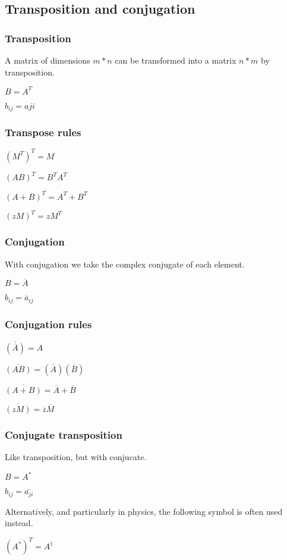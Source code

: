 
\subsection{Transposition and conjugation}

\subsubsection{Transposition}

A matrix of dimensions \(m*n\) can be transformed into a matrix \(n*m\) by transposition.

$B=A^T$

$b_{ij}=a{ji}$

\subsubsection{Transpose rules}

$(M^T)^T=M$

$(AB)^T=B^TA^T$

$(A+B)^T=A^T+B^T$

$(zM)^T=zM^T$

\subsubsection{Conjugation}

With conjugation we take the complex conjugate of each element.

$B=\overline A$

\(b_{ij}=\overline a_{ij}\)

\subsubsection{Conjugation rules}

$\overline {(\overline A)}=A$

$\overline {(AB)}=(\overline A)( \overline B)$

$\overline {(A+B)}=\overline A+\overline B$

$\overline {(zM)}=\overline z \overline M$

\subsubsection{Conjugate transposition}

Like transposition, but with conjucate.

$B=A^*$

$b_{ij}=\bar{a_{ji}}$

Alternatively, and particularly in physics, the following symbol is often used instead.

$(A^*)^T=A^\dagger$

